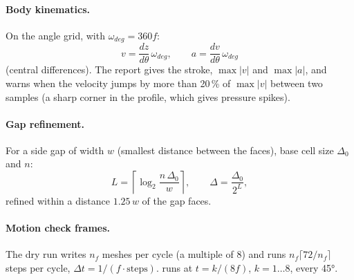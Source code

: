 \paragraph{Body kinematics.}
On the angle grid, with $\omega_{deg} = 360 f$:
\begin{equation}
v = \frac{dz}{d\theta}\,\omega_{deg}, \qquad a = \frac{dv}{d\theta}\,\omega_{deg}
\end{equation}
(central differences). The report gives the stroke, $\max|v|$ and $\max|a|$, and warns when the velocity jumps by more than 20\,\% of $\max|v|$ between two samples (a sharp corner in the profile, which gives pressure spikes).

\paragraph{Gap refinement.}
For a side gap of width $w$ (smallest distance between the  faces), base cell size $\Delta_0$ and  $n$:
\begin{equation}
L = \left\lceil \log_2 \frac{n\,\Delta_0}{w} \right\rceil, \qquad \Delta = \frac{\Delta_0}{2^L} ,
\end{equation}
refined within a distance $1.25\,w$ of the gap faces.

\paragraph{Motion check frames.}
The dry run writes  $n_f$ meshes per cycle (a multiple of 8) and runs $n_f\lceil 72/n_f\rceil$ steps per cycle, $\Delta t = 1/(f \cdot \textrm{steps})$.  runs at $t = k/(8f)$, $k = 1 \ldots 8$, every 45°.

